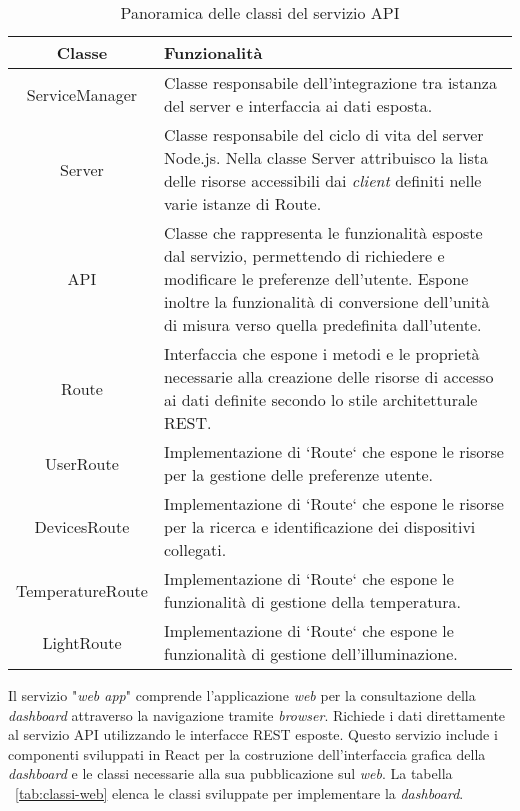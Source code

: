 \begin{table}[!h]
\caption{Panoramica delle classi del servizio API}
\label{tab:classi-api}
\begin{tabularx}{\linewidth}{|c|X|}
\hline
\textbf{Classe} & \textbf{Funzionalità} \\
\hline
ServiceManager & Classe responsabile dell'integrazione tra istanza del server e interfaccia ai dati esposta. \\
\hline
Server & Classe responsabile del ciclo di vita del server Node.js. Nella classe Server attribuisco la lista delle risorse accessibili dai \emph{client} definiti nelle varie istanze di Route. \\
\hline
API & Classe che rappresenta le funzionalità esposte dal servizio, permettendo di richiedere e modificare le preferenze dell'utente. Espone inoltre la funzionalità di conversione dell'unità di misura verso quella predefinita dall'utente. \\
\hline
Route & Interfaccia che espone i metodi e le proprietà necessarie alla creazione delle risorse di accesso ai dati definite secondo lo stile architetturale REST. \\
\hline
UserRoute & Implementazione di `Route` che espone le risorse per la gestione delle preferenze utente. \\
\hline
DevicesRoute & Implementazione di `Route` che espone le risorse per la ricerca e identificazione dei dispositivi collegati. \\
\hline
TemperatureRoute & Implementazione di `Route` che espone le funzionalità di gestione della temperatura. \\
\hline
LightRoute & Implementazione di `Route` che espone le funzionalità di gestione dell'illuminazione. \\
\hline
\end{tabularx}
\end{table}


Il servizio "\emph{web app}" comprende l'applicazione \emph{web} per la consultazione della \emph{dashboard} attraverso la navigazione tramite \emph{browser}.
Richiede i dati direttamente al servizio API utilizzando le interfacce REST esposte.
Questo servizio include i componenti sviluppati in React per la costruzione dell'interfaccia grafica della \emph{dashboard} e le classi necessarie alla sua pubblicazione sul \emph{web}.
La tabella ~\ref{tab:classi-web} elenca le classi sviluppate per implementare la \emph{dashboard}.

